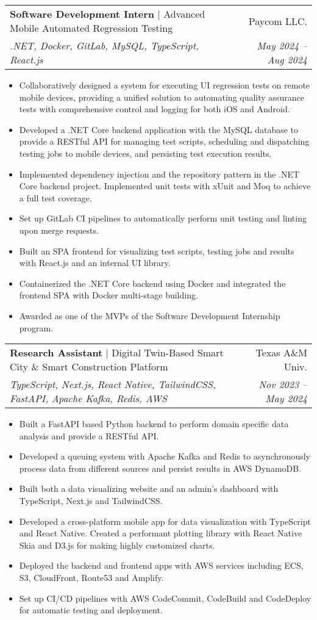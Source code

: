 \documentclass[letterpaper,11pt]{article}
\makeatletter
\newcommand{\mySecondaryItem}[1]{
  \item\raggedright\small{#1\vspace{-.5pt}}
}
\newcommand{\twoRowSubHeading}[5]{
  \item
  \begin{tabular*}{0.97\textwidth}{l@{\extracolsep{\fill}}r}
    \textbf{#1} | {#2} & {#3} \\
    \small{\textit{#4}} & \textit{\small{#5}} \\
  \end{tabular*}\vspace{-5pt}
}
\newcommand{\itemListStart}{\begin{itemize}[leftmargin=*]}
\newcommand{\itemListEnd}{\end{itemize}\vspace{-5pt}}
\makeatother
\begin{document}
\twoRowSubHeading
{Software Development Intern}
{Advanced Mobile Automated Regression Testing}
{Paycom LLC.}
{.NET, Docker, GitLab, MySQL, TypeScript, React.js}
{May 2024 -- Aug 2024}
\itemListStart
\mySecondaryItem{
  Collaboratively designed a system for executing UI regression tests on remote mobile devices, providing a unified solution to automating quality assurance tests with comprehensive control and logging for both iOS and Android.
}
\mySecondaryItem{
  Developed a .NET Core backend application with the MySQL database to provide a RESTful API for managing test scripts, scheduling and dispatching testing jobs to mobile devices, and persisting test execution results.
}
\mySecondaryItem{
  Implemented dependency injection and the repository pattern in the .NET Core backend project. Implemented unit tests with xUnit and Moq to achieve a full test coverage.
}
\mySecondaryItem{
  Set up GitLab CI pipelines to automatically perform unit testing and linting upon merge requests.
}
\mySecondaryItem{
  Built an SPA frontend for visualizing test scripts, testing jobs and results with React.js and an internal UI library.
}
\mySecondaryItem{
  Containerized the .NET Core backend using Docker and integrated the frontend SPA with Docker multi-stage building.
}
\mySecondaryItem{
  Awarded as one of the MVPs of the Software Development Internship program.
}
\itemListEnd

\twoRowSubHeading
{Research Assistant}
{Digital Twin-Based Smart City \& Smart Construction Platform
}
{Texas A\&M Univ.}
{TypeScript, Next.js, React Native, TailwindCSS, FastAPI, Apache Kafka, Redis, AWS}
{Nov 2023 -- May 2024}
\itemListStart
\mySecondaryItem{
  Built a FastAPI based Python backend to perform domain specific data analysis and provide a RESTful API.
}
\mySecondaryItem{
  Developed a queuing system with Apache Kafka and Redis to asynchronously process data from different sources and persist results in AWS DynamoDB.
}
\mySecondaryItem{
  Built both a data visualizing website and an admin's dashboard with TypeScript, Next.js and TailwindCSS.
}
\mySecondaryItem{
  Developed a cross-platform mobile app for data visualization with TypeScript and React Native. Created a performant plotting library with React Native Skia and D3.js for making highly customized charts.
}
\mySecondaryItem{
  Deployed the backend and frontend apps with AWS services including ECS, S3, CloudFront, Route53 and Amplify.
}
\mySecondaryItem{
  Set up CI/CD pipelines with AWS CodeCommit, CodeBuild and CodeDeploy for automatic testing and deployment.
}
\itemListEnd
\end{document}
